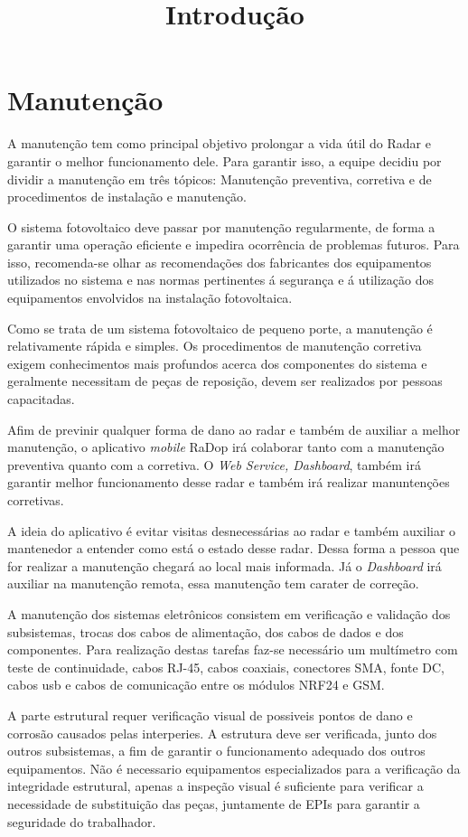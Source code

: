 
\chapter{Manutenção}

\title{Introdução}

A manutenção tem como principal objetivo prolongar a vida útil do Radar e garantir o melhor funcionamento dele. Para garantir isso, a equipe decidiu por dividir a manutenção em três tópicos: Manutenção preventiva, corretiva e de procedimentos de instalação e manutenção.

O sistema fotovoltaico deve passar por manutenção regularmente, de forma a garantir uma operação eficiente e impedira ocorrência de problemas futuros. Para isso, recomenda-se olhar as recomendações dos fabricantes dos equipamentos utilizados no sistema e nas normas pertinentes á segurança e á utilização dos equipamentos envolvidos na instalação fotovoltaica.

Como se trata de um sistema fotovoltaico de pequeno porte, a manutenção é relativamente rápida e simples. Os procedimentos de manutenção corretiva exigem conhecimentos mais profundos acerca dos componentes do sistema e geralmente necessitam de peças de reposição, devem ser realizados por pessoas capacitadas.



Afim de previnir qualquer forma de dano ao radar e também de auxiliar a melhor manutenção, o aplicativo \textit{mobile} RaDop irá colaborar tanto com a manutenção preventiva quanto com a corretiva. O \textit{Web Service, Dashboard}, também irá garantir melhor funcionamento desse radar e também irá realizar manuntenções corretivas. 

A ideia do aplicativo é evitar visitas desnecessárias ao radar e também auxiliar o mantenedor a entender como está o estado desse radar. Dessa forma a pessoa que for realizar a manutenção chegará ao local mais informada. Já o \textit{Dashboard} irá auxiliar na manutenção remota, essa manutenção tem carater de correção.

A manutenção dos sistemas eletrônicos consistem em verificação e validação dos subsistemas, trocas dos cabos de alimentação, dos cabos de dados e dos componentes. Para realização destas tarefas faz-se necessário um multímetro com teste de continuidade, cabos RJ-45, cabos coaxiais, conectores SMA, fonte DC, cabos usb e cabos de comunicação entre os módulos NRF24 e GSM.

A parte estrutural requer verificação visual de possiveis pontos de dano e corrosão causados pelas interperies. A estrutura deve ser verificada, junto dos outros subsistemas, a fim de garantir o funcionamento adequado dos outros equipamentos. Não é necessario equipamentos especializados para a verificação da integridade estrutural, apenas a inspeção visual é suficiente para verificar a necessidade de substituição das peças, juntamente de EPIs para garantir a seguridade do trabalhador.

